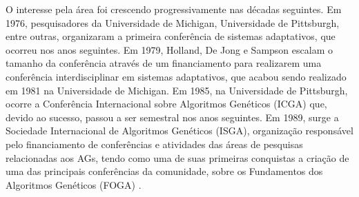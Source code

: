 O interesse pela área foi crescendo progressivamente nas décadas seguintes. Em 1976, pesquisadores da Universidade de Michigan, Universidade de Pittsburgh, entre outras, organizaram a primeira conferência de sistemas adaptativos, que ocorreu nos anos seguintes. Em 1979, Holland, De Jong e Sampson escalam o tamanho da conferência através de um financiamento para realizarem uma conferência interdisciplinar em sistemas adaptativos, que acabou sendo realizado em 1981 na Universidade de Michigan. Em 1985, na Universidade de Pittsburgh, ocorre a Conferência Internacional sobre Algoritmos Genéticos (ICGA) que, devido ao sucesso, passou a ser semestral nos anos seguintes. Em 1989, surge a Sociedade Internacional de Algoritmos Genéticos (ISGA), organização responsável pelo financiamento de conferências e atividades das áreas de pesquisas relacionadas aos AGs, tendo como uma de suas primeiras conquistas a criação de uma das principais conferências da comunidade, sobre os Fundamentos dos Algoritmos Genéticos (FOGA) \cite[pg.A2.3:5]{back_handbook_1997}.


		

